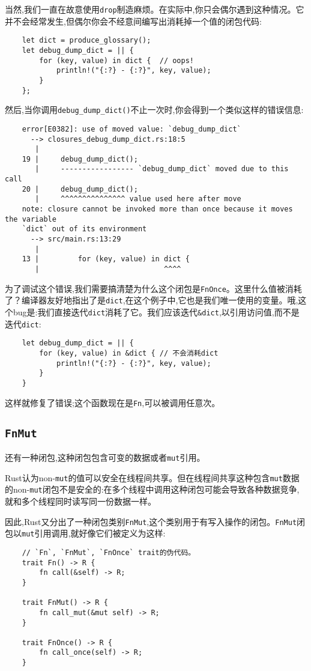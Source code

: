 当然,我们一直在故意使用\texttt{drop}制造麻烦。在实际中,你只会偶尔遇到这种情况。它并不会经常发生,但偶尔你会不经意间编写出消耗掉一个值的闭包代码:
\begin{verbatim}
    let dict = produce_glossary();
    let debug_dump_dict = || {
        for (key, value) in dict {  // oops!
            println!("{:?} - {:?}", key, value);
        }
    };
\end{verbatim}

然后,当你调用\texttt{debug\_dump\_dict()}不止一次时,你会得到一个类似这样的错误信息:
\begin{verbatim}
    error[E0382]: use of moved value: `debug_dump_dict`
      --> closures_debug_dump_dict.rs:18:5
       |
    19 |     debug_dump_dict();
       |     ----------------- `debug_dump_dict` moved due to this call
    20 |     debug_dump_dict();
       |     ^^^^^^^^^^^^^^^ value used here after move
    note: closure cannot be invoked more than once because it moves the variable
    `dict` out of its environment
      --> src/main.rs:13:29
       |
    13 |         for (key, value) in dict {
       |                             ^^^^
\end{verbatim}

为了调试这个错误,我们需要搞清楚为什么这个闭包是\texttt{FnOnce}。这里什么值被消耗了？编译器友好地指出了是\texttt{dict},在这个例子中,它也是我们唯一使用的变量。哦,这个bug是:我们直接迭代\texttt{dict}消耗了它。我们应该迭代\texttt{\&dict},以引用访问值,而不是迭代\texttt{dict}:
\begin{verbatim}
    let debug_dump_dict = || {
        for (key, value) in &dict { // 不会消耗dict
            println!("{:?} - {:?}", key, value);
        }
    }
\end{verbatim}

这样就修复了错误;这个函数现在是\texttt{Fn},可以被调用任意次。

\subsection{\texttt{FnMut}}
还有一种闭包,这种闭包包含可变的数据或者\texttt{mut}引用。

Rust认为non-\texttt{mut}的值可以安全在线程间共享。但在线程间共享这种包含\texttt{mut}数据的non-\texttt{mut}闭包不是安全的:在多个线程中调用这种闭包可能会导致各种数据竞争,就和多个线程同时读写同一份数据一样。

因此,Rust又分出了一种闭包类别\texttt{FnMut},这个类别用于有写入操作的闭包。\texttt{FnMut}闭包以\texttt{mut}引用调用,就好像它们被定义为这样:
\begin{verbatim}
    // `Fn`, `FnMut`, `FnOnce` trait的伪代码。
    trait Fn() -> R {
        fn call(&self) -> R;
    }

    trait FnMut() -> R {
        fn call_mut(&mut self) -> R;
    }

    trait FnOnce() -> R {
        fn call_once(self) -> R;
    }
\end{verbatim}

